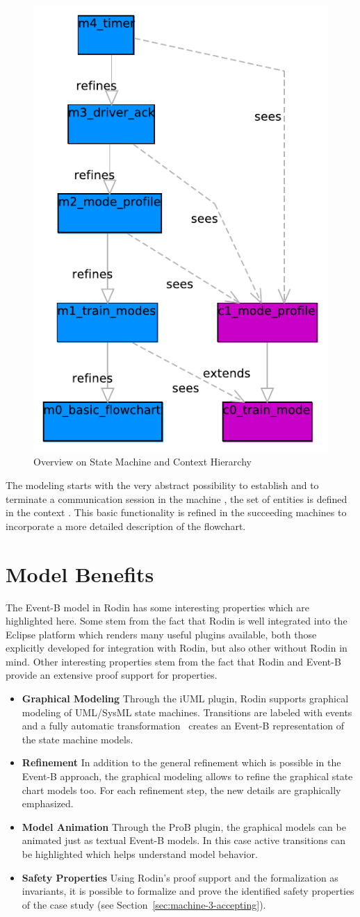 \documentclass{template/openetcs_article}
\begin{document}
\begin{figure}[ht]
  \centering
  \includegraphics[width=.3\textwidth]{SubSet_026_5_9}
  \caption{Overview on State Machine and Context Hierarchy}
  \label{fig:model-overview}
\end{figure}

The modeling starts with the very abstract possibility to establish and to
terminate a communication session in the machine , the set of
entities is defined in the context . This basic functionality is
refined in the succeeding machines to incorporate a more detailed description of
the flowchart.

\section{Model Benefits}
\label{sec:model-highlights}

The Event-B model in Rodin has some interesting properties which are highlighted
here. Some stem from the fact that Rodin is well integrated into the Eclipse
platform which renders many useful plugins available, both those explicitly
developed for integration with Rodin, but also other without Rodin in mind.
Other interesting properties stem from the fact that Rodin and Event-B provide
an extensive proof support for properties.

\begin{itemize}
\item {\bf Graphical Modeling} Through the iUML plugin, Rodin supports graphical
  modeling of UML/SysML state machines. Transitions are labeled with events and
  a fully automatic transformation~\cite{said2009language} creates an Event-B
  representation of the state machine models.
\item {\bf Refinement} In addition to the general refinement which is possible
  in the Event-B approach, the graphical modeling allows to refine the graphical
  state chart models too. For each refinement step, the new details are
  graphically emphasized.
\item {\bf Model Animation} Through the ProB plugin, the graphical models can be
  animated just as textual Event-B models. In this case active transitions can
  be highlighted which helps understand model behavior.
\item {\bf Safety Properties} Using Rodin's proof support and the formalization
  as invariants, it is possible to formalize and prove the identified safety
  properties of the case study (see Section~\ref{sec:machine-3-accepting}).
\end{itemize}
\end{document}

